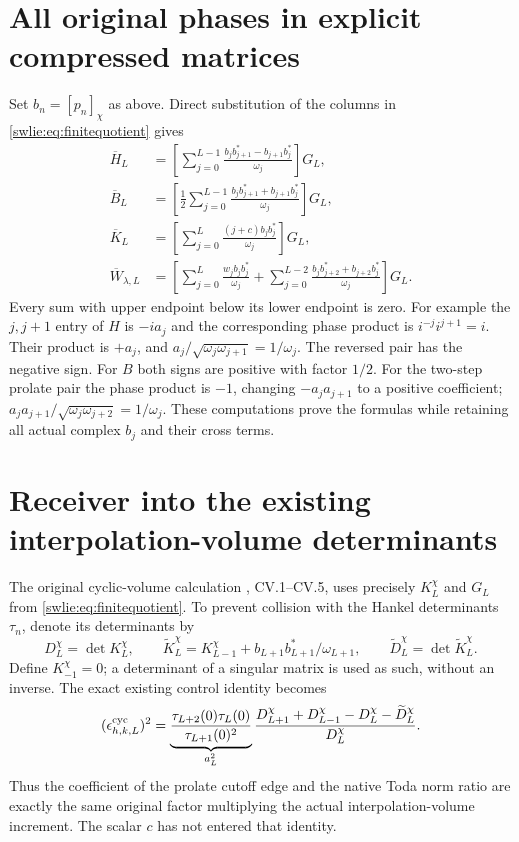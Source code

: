 \documentclass[11pt]{article}
\begin{document}
\section{All original phases in explicit compressed matrices}

Set $b_n=[p_n]_\chi$ as above. Direct substitution of
the columns in \eqref{swlie:eq:finitequotient} gives
\begin{equation}\label{swlie:eq:explicitcompressed}
 \begin{aligned}
 \overline H_L
 &=\left[\sum_{j=0}^{L-1}
       \frac{b_jb_{j+1}^*-b_{j+1}b_j^*}{\omega_j}\right]G_L,\\
 \overline B_L
 &=\left[\frac12\sum_{j=0}^{L-1}
       \frac{b_jb_{j+1}^*+b_{j+1}b_j^*}{\omega_j}\right]G_L,\\
 \overline K_L
 &=\left[\sum_{j=0}^L
                  \frac{(j+c)b_jb_j^*}{\omega_j}\right]G_L,\\
 \overline W_{\lambda,L}
 &=\left[\sum_{j=0}^L\frac{w_jb_jb_j^*}{\omega_j}
      +\sum_{j=0}^{L-2}
             \frac{b_jb_{j+2}^*+b_{j+2}b_j^*}{\omega_j}\right]G_L.
 \end{aligned}
\end{equation}
Every sum with upper endpoint below its lower endpoint
is zero. For example the $j,j+1$ entry of $H$ is
$-ia_j$ and the corresponding phase product is
$i^{-j}i^{j+1}=i$. Their product is $+a_j$,
and $a_j/\sqrt{\omega_j\omega_{j+1}}=1/\omega_j$.
The reversed pair has the negative sign. For $B$
both signs are positive with factor $1/2$.
For the two-step prolate pair the phase product is
$-1$, changing $-a_ja_{j+1}$ to a positive coefficient;
$a_ja_{j+1}/\sqrt{\omega_j\omega_{j+2}}=1/\omega_j$.
These computations prove the formulas while retaining
all actual complex $b_j$ and their cross terms.

\section{Receiver into the existing interpolation-volume determinants}

The original cyclic-volume calculation \cite{swlie:CV}, CV.1--CV.5,
uses precisely $K_L^\chi$ and $G_L$ from
\eqref{swlie:eq:finitequotient}. To prevent collision with the
Hankel determinants $\tau_n$, denote its determinants by
\[
 D_L^\chi=\det K_L^\chi,\qquad
 \widetilde K_L^\chi=K_{L-1}^\chi
                     +b_{L+1}b_{L+1}^*/\omega_{L+1},
 \qquad \widetilde D_L^\chi=\det\widetilde K_L^\chi.
\]
Define $K_{-1}^\chi=0$; a determinant of a singular
matrix is used as such, without an inverse.
The exact existing control identity becomes
\begin{equation}\label{swlie:eq:CVreceiver}
 (\epsilon_{h,k,L}^{\rm cyc})^2
 =\underbrace{\frac{\tau_{L+2}(0)\tau_L(0)}
                         {\tau_{L+1}(0)^2}}_{a_L^2}
   \frac{D_{L+1}^\chi+D_{L-1}^\chi
                    -D_L^\chi-\widetilde D_L^\chi}{D_L^\chi}.
\end{equation}
Thus the coefficient of the prolate cutoff edge and
the native Toda norm ratio are exactly the same original
factor multiplying the actual interpolation-volume
increment. The scalar $c$ has not entered that identity.
\end{document}
